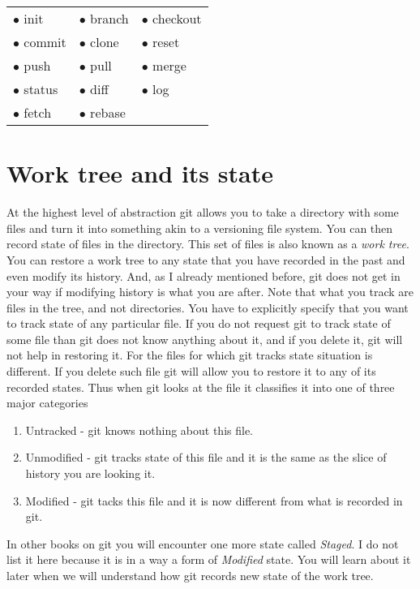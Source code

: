 \documentclass{article}
\theoremstyle{definition}
\begin{document}
        \begin{center}
        \begin{tabular}{ l l l }
        $\bullet$ init & $\bullet$ branch & $\bullet$ checkout \\
        $\bullet$ commit & $\bullet$ clone & $\bullet$ reset \\
        $\bullet$ push & $\bullet$ pull & $\bullet$ merge \\
        $\bullet$ status & $\bullet$ diff & $\bullet$ log \\
        $\bullet$ fetch & $\bullet$ rebase
        \end{tabular}
        \end{center}

        \newpage
        \section{Work tree and its state}
        At the highest level of abstraction git allows you to take a directory with some files and turn it into
        something akin to a versioning file system. You can then record state of files in the directory. This set of 
        files is also known as a {\em work tree}.
        You can restore a work tree to any state that you have recorded in the past and even modify its
        history. And, as I already mentioned before, git does not get in your way if modifying history is what you are
        after. Note that what you track are files in the tree, and not directories. You have to explicitly specify that you
        want to track state of any particular file. If you do not request git to track state of some file than git does
        not know anything about it, and if you delete it, git will not help in restoring it. For the files for which git
        tracks state situation is different. If you delete such file git will allow you to restore it to any of its
        recorded states. Thus when git looks at the file it classifies it into one of three major categories
        \begin{enumerate}
                \item Untracked - git knows nothing about this file.
                \item Unmodified - git tracks state of this file and it is the same as the slice of history you are looking it.
                \item Modified - git tacks this file and it is now different from what is recorded in git.
        \end{enumerate}
        In other books on git you will encounter one more state called {\em Staged}.
        I do not list it here because it is in a way a form of {\em Modified} state. You will learn about it later when
        we will understand how git records new state of the work tree.
\end{document}
